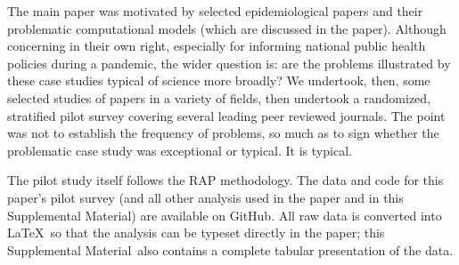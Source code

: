 \documentclass[10pt,a4paper]{article}
\def\supplement{Supplemental Material}
\begin{document}
The main paper was motivated by selected epidemiological papers and their problematic computational models (which are discussed in the paper). Although concerning in their own right, especially for informing national public health policies during a pandemic, the wider question is: are the problems illustrated by these case studies typical of science more broadly? We undertook, then, some selected studies of papers in a variety of fields, then undertook a randomized, stratified pilot survey covering several leading peer reviewed journals. The point was not to establish the frequency of problems, so much as to sign whether the problematic case study was exceptional or typical. It is typical.




The pilot study itself follows the RAP methodology. The data and code for this paper's pilot survey (and all other analysis used in the paper and in this \supplement) are available on GitHub. All raw data is converted into \LaTeX\ so that the analysis can be typeset directly in the paper; this \supplement\ also contains a complete tabular presentation of the data.
\end{document}
